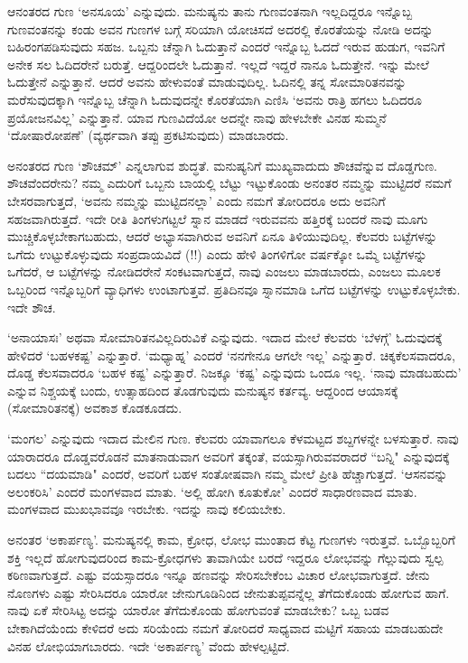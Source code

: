 ಆನಂತರದ ಗುಣ `ಅನಸೂಯ' ಎನ್ನುವುದು. ಮನುಷ್ಯನು ತಾನು ಗುಣವಂತನಾಗಿ ಇಲ್ಲದಿದ್ದರೂ ಇನ್ನೊಬ್ಬ ಗುಣವಂತನನ್ನು ಕಂಡು ಅವನ ಗುಣಗಳ ಬಗ್ಗೆ ಸರಿಯಾಗಿ 
ಯೋಚಿಸದೆ ಅದರಲ್ಲಿ ಕೊರತೆಯನ್ನು ನೋಡಿ ಅದನ್ನು ಬಹಿರಂಗಪಡಿಸುವುದು ಸಹಜ. ಒಬ್ಬನು ಚೆನ್ನಾಗಿ ಓದುತ್ತಾನೆ ಎಂದರೆ ಇನ್ನೊಬ್ಬ ಓದದೆ ಇರುವ 
ಹುಡುಗ, ಇವನಿಗೆ ಅನೇಕ ಸಲ ಓದಿದರೇನೆ ಬರುತ್ತೆ. ಆದ್ದರಿಂದಲೇ ಓದುತ್ತಾನೆ. ಇಲ್ಲದೆ ಇದ್ದರೆ ನಾನೂ ಓದುತ್ತೇನೆ. ಇನ್ನು ಮೇಲೆ ಓದುತ್ತೇನೆ ಎನ್ನುತ್ತಾನೆ. 
ಆದರೆ ಅವನು ಹೇಳುವಂತೆ ಮಾಡುವುದಿಲ್ಲ. ಓದಿನಲ್ಲಿ ತನ್ನ ಸೋಮಾರಿತನವನ್ನು ಮರೆಸುವುದಕ್ಕಾಗಿ ಇನ್ನೊಬ್ಬ ಚೆನ್ನಾಗಿ ಓದುವುದನ್ನೇ ಕೊರತೆಯಾಗಿ ಎಣಿಸಿ `ಅವನು 
ರಾತ್ರಿ ಹಗಲು ಓದಿದರೂ ಪ್ರಯೋಜನವಿಲ್ಲ' ಎನ್ನುತ್ತಾನೆ. ಯಾವ ಗುಣವಿದೆಯೋ ಅದನ್ನೇ ನಾವು ಹೇಳಬೇಕೇ ವಿನಹ ಸುಮ್ಮನೆ `ದೋಷಾರೋಪಣೆ' (ವ್ಯರ್ಥವಾಗಿ ತಪ್ಪು ಪ್ರಕಟಿಸುವುದು) ಮಾಡಬಾರದು.

ಅನಂತರದ ಗುಣ `ಶೌಚಮ್' ಎನ್ನಲಾಗುವ ಶುದ್ಧತೆ. ಮನುಷ್ಯನಿಗೆ ಮುಖ್ಯವಾದುದು ಶೌಚವೆನ್ನುವ ದೊಡ್ಡಗುಣ. ಶೌಚವೆಂದರೇನು? ನಮ್ಮ ಎದುರಿಗೆ 
ಒಬ್ಬನು ಬಾಯಲ್ಲಿ ಬೆಟ್ಟು ಇಟ್ಟುಕೊಂಡು ಅನಂತರ ನಮ್ಮನ್ನು ಮುಟ್ಟಿದರೆ ನಮಗೆ ಬೇಸರವಾಗುತ್ತದೆ, `ಅವನು ನಮ್ಮನ್ನು ಮುಟ್ಟಿದನಲ್ಲಾ' 
ಎಂದು ನಮಗೆ ತೋರಿದರೂ ಅದು ಅವನಿಗೆ ಸಹಜವಾಗಿರುತ್ತದೆ. ಇದೇ ರೀತಿ ತಿಂಗಳುಗಟ್ಟಲೆ ಸ್ನಾನ ಮಾಡದೆ ಇರುವವನು ಹತ್ತಿರಕ್ಕೆ ಬಂದರೆ ನಾವು 
ಮೂಗು ಮುಚ್ಚಿಕೊಳ್ಳಬೇಕಾಗಬಹುದು, ಆದರೆ ಅಭ್ಯಾಸವಾಗಿರುವ ಅವನಿಗೆ ಏನೂ ತಿಳಿಯುವುದಿಲ್ಲ. ಕೆಲವರು ಬಟ್ಟೆಗಳನ್ನು ಒಗೆದು ಉಟ್ಟುಕೊಳ್ಳುವುದು 
ಸಂಪ್ರದಾಯವಿದೆ (!!) ಎಂದು ಹೇಳಿ ತಿಂಗಳಿಗೋ ವರ್ಷಕ್ಕೋ ಒಮ್ಮೆ ಬಟ್ಟೆಗಳನ್ನು ಒಗೆದರೆ, ಆ ಬಟ್ಟೆಗಳನ್ನು ನೋಡಿದರೇನೆ ಸಂಕಟವಾಗುತ್ತದೆ, ನಾವು ಎಂಜಲು 
ಮಾಡಬಾರದು, ಎಂಜಲು ಮೂಲಕ ಒಬ್ಬರಿಂದ ಇನ್ನೊಬ್ಬರಿಗೆ ವ್ಯಾಧಿಗಳು ಉಂಟಾಗುತ್ತವೆ. ಪ್ರತಿದಿನವೂ ಸ್ನಾನಮಾಡಿ ಒಗೆದ ಬಟ್ಟೆಗಳನ್ನು ಉಟ್ಟುಕೊಳ್ಳಬೇಕು. ಇದೇ ಶೌಚ.

`ಅನಾಯಾಸಃ' ಅಥವಾ ಸೋಮಾರಿತನವಿಲ್ಲದಿರುವಿಕೆ ಎನ್ನುವುದು. ಇದಾದ ಮೇಲೆ ಕೆಲವರು `ಬೆಳಗ್ಗೆ' ಓದುವುದಕ್ಕೆ ಹೇಳಿದರೆ `ಬಹಳಕಷ್ಟ' ಎನ್ನುತ್ತಾರೆ. 
`ಮಧ್ಯಾಹ್ನ' ಎಂದರೆ `ನನಗೇನೂ ಆಗಲೇ ಇಲ್ಲ' ಎನ್ನುತ್ತಾರೆ. ಚಿಕ್ಕಕೆಲಸವಾದರೂ, ದೊಡ್ಡ ಕೆಲಸವಾದರೂ `ಬಹಳ ಕಷ್ಟ' ಎನ್ನುತ್ತಾರೆ. ನಿಜಕ್ಕೂ `ಕಷ್ಟ' ಎನ್ನುವುದು ಒಂದೂ ಇಲ್ಲ. `ನಾವು 
ಮಾಡಬಹುದು' ಎನ್ನುವ ನಿಶ್ಚಯಕ್ಕೆ ಬಂದು, ಉತ್ಸಾಹದಿಂದ ತೊಡಗುವುದು ಮನುಷ್ಯನ ಕರ್ತವ್ಯ. ಆದ್ದರಿಂದ ಆಯಾಸಕ್ಕೆ  (ಸೋಮಾರಿತನಕ್ಕೆ) ಅವಕಾಶ ಕೊಡಕೂಡದು.

`ಮಂಗಲ' ಎನ್ನುವುದು ಇದಾದ ಮೇಲಿನ ಗುಣ. ಕೆಲವರು ಯಾವಾಗಲೂ ಕೆಳಮಟ್ಟದ ಶಬ್ದಗಳನ್ನೇ ಬಳಸುತ್ತಾರೆ. ನಾವು ಯಾರಾದರೂ ದೊಡ್ಡವರೊಡನೆ ಮಾತನಾಡುವಾಗ 
ಅವರಿಗೆ ತಕ್ಕಂತೆ, ವಯಸ್ಸಾಗಿರುವವರಾದರೆ ``ಬನ್ನಿ" ಎನ್ನುವುದಕ್ಕೆ ಬದಲು ``ದಯಮಾಡಿ" ಎಂದರೆ, ಅವರಿಗೆ ಬಹಳ ಸಂತೋಷವಾಗಿ ನಮ್ಮ ಮೇಲೆ ಪ್ರೀತಿ ಹೆಚ್ಚಾಗುತ್ತದೆ. 
`ಆಸನವನ್ನು ಅಲಂಕರಿಸಿ' ಎಂದರೆ ಮಂಗಳವಾದ ಮಾತು. `ಅಲ್ಲಿ ಹೋಗಿ ಕೂತುಕೋ' ಎಂದರೆ ಸಾಧಾರಣವಾದ ಮಾತು. ಮಂಗಳವಾದ ಮುಖಭಾವವೂ ಇರಬೇಕು. ಇದನ್ನು ನಾವು ಕಲಿಯಬೇಕು.

ಅನಂತರ `ಅಕಾರ್ಪಣ್ಯ'. ಮನುಷ್ಯನಲ್ಲಿ ಕಾಮ, ಕ್ರೋಧ, ಲೋಭ ಮುಂತಾದ ಕೆಟ್ಟ ಗುಣಗಳು ಇರುತ್ತವೆ. ಒಬ್ಬೊಬ್ಬರಿಗೆ ಶಕ್ತಿ ಇಲ್ಲದೆ ಹೋಗುವುದರಿಂದ 
ಕಾಮ-ಕ್ರೋಧಗಳು ತಾವಾಗಿಯೇ ಬರದೆ ಇದ್ದರೂ ಲೋಭವನ್ನು ಗೆಲ್ಲುವುದು ಸ್ವಲ್ಪ ಕಠಿಣವಾಗುತ್ತದೆ. ಎಷ್ಟು ವಯಸ್ಸಾದರೂ ಇನ್ನೂ ಹಣವನ್ನು 
ಸೇರಿಸಬೇಕೆಂಬ ವಿಚಾರ ಲೋಭವಾಗುತ್ತದೆ. ಜೇನು ನೊಣಗಳು ಎಷ್ಟು ಸೇರಿಸಿದರೂ ಯಾರೋ ಜೇನುಗೂಡಿನಿಂದ ಜೇನುತುಪ್ಪವನ್ನೆಲ್ಲ 
ತೆಗೆದುಕೊಂಡು ಹೋಗುವ ಹಾಗೆ. ನಾವು ಏಕೆ ಸೇರಿಸಿಟ್ಟ ಅದನ್ನು ಯಾರೋ ತೆಗೆದುಕೊಂಡು ಹೋಗುವಂತೆ ಮಾಡಬೇಕು? ಒಬ್ಬ ಬಡವ 
ಬೇಕಾಗಿದೆಯೆಂದು ಕೇಳಿದರೆ ಅದು ಸರಿಯೆಂದು ನಮಗೆ ತೋರಿದರೆ ಸಾಧ್ಯವಾದ ಮಟ್ಟಿಗೆ ಸಹಾಯ ಮಾಡಬಹುದೇ ವಿನಹ ಲೋಭಿಯಾಗಬಾರದು. ಇದೇ `ಅಕಾರ್ಪಣ್ಯ' ವೆಂದು ಹೇಳಲ್ಪಟ್ಟಿದೆ.

